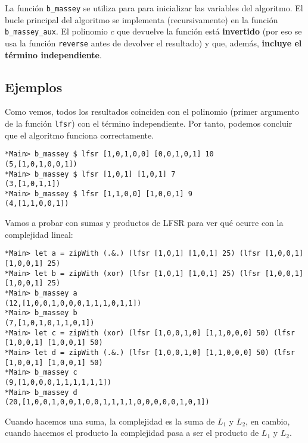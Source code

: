 \documentclass[10pt,spanish]{article}
\begin{document}
La función \texttt{b\_massey} se utiliza para para inicializar las variables del algoritmo. El bucle principal del algoritmo se implementa (recursivamente) en la función \texttt{b\_massey\_aux}. El polinomio $c$ que devuelve la función está \textbf{\textcolor{azul}{invertido}} (por eso se usa la función \texttt{reverse} antes de devolver el resultado) y que, además, \textbf{\textcolor{azul}{incluye el término independiente}}.

\subsection{\textcolor{azul}Ejemplos}

Como vemos, todos los resultados coinciden con el polinomio (primer argumento de la función \texttt{lfsr}) con el término independiente. Por tanto, podemos concluir que el algoritmo funciona correctamente.

\begin{verbatim}
*Main> b_massey $ lfsr [1,0,1,0,0] [0,0,1,0,1] 10
(5,[1,0,1,0,0,1])
*Main> b_massey $ lfsr [1,0,1] [1,0,1] 7
(3,[1,0,1,1])
*Main> b_massey $ lfsr [1,1,0,0] [1,0,0,1] 9
(4,[1,1,0,0,1])
\end{verbatim}

Vamos a probar con sumas y productos de LFSR para ver qué ocurre con la complejidad lineal:

\begin{verbatim}
*Main> let a = zipWith (.&.) (lfsr [1,0,1] [1,0,1] 25) (lfsr [1,0,0,1] [1,0,0,1] 25)
*Main> let b = zipWith (xor) (lfsr [1,0,1] [1,0,1] 25) (lfsr [1,0,0,1] [1,0,0,1] 25)
*Main> b_massey a
(12,[1,0,0,1,0,0,0,1,1,1,0,1,1])
*Main> b_massey b 
(7,[1,0,1,0,1,1,0,1])
*Main> let c = zipWith (xor) (lfsr [1,0,0,1,0] [1,1,0,0,0] 50) (lfsr [1,0,0,1] [1,0,0,1] 50)
*Main> let d = zipWith (.&.) (lfsr [1,0,0,1,0] [1,1,0,0,0] 50) (lfsr [1,0,0,1] [1,0,0,1] 50)
*Main> b_massey c 
(9,[1,0,0,0,1,1,1,1,1,1])
*Main> b_massey d
(20,[1,0,0,1,0,0,1,0,0,1,1,1,1,0,0,0,0,0,1,0,1])
\end{verbatim}

Cuando hacemos una suma, la complejidad es la suma de $L_1$ y $L_2$, en cambio, cuando hacemos el producto la complejidad pasa a ser el producto de $L_1$ y $L_2$. 
\end{document}
